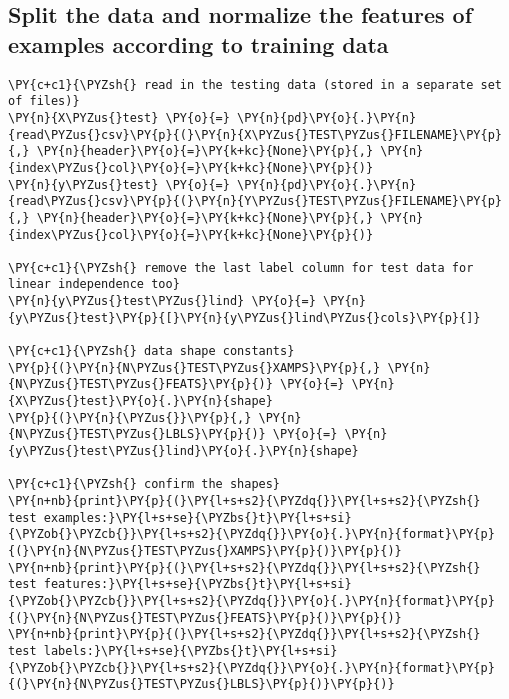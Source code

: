     \hypertarget{split-the-data-and-normalize-the-features-of-examples-according-to-training-data}{%
\subsection{Split the data and normalize the features of examples
according to training
data}\label{split-the-data-and-normalize-the-features-of-examples-according-to-training-data}}

    \begin{tcolorbox}[breakable, size=fbox, boxrule=1pt, pad at break*=1mm,colback=cellbackground, colframe=cellborder]
\begin{Verbatim}[commandchars=\\\{\}]
\PY{c+c1}{\PYZsh{} read in the testing data (stored in a separate set of files)}
\PY{n}{X\PYZus{}test} \PY{o}{=} \PY{n}{pd}\PY{o}{.}\PY{n}{read\PYZus{}csv}\PY{p}{(}\PY{n}{X\PYZus{}TEST\PYZus{}FILENAME}\PY{p}{,} \PY{n}{header}\PY{o}{=}\PY{k+kc}{None}\PY{p}{,} \PY{n}{index\PYZus{}col}\PY{o}{=}\PY{k+kc}{None}\PY{p}{)}
\PY{n}{y\PYZus{}test} \PY{o}{=} \PY{n}{pd}\PY{o}{.}\PY{n}{read\PYZus{}csv}\PY{p}{(}\PY{n}{Y\PYZus{}TEST\PYZus{}FILENAME}\PY{p}{,} \PY{n}{header}\PY{o}{=}\PY{k+kc}{None}\PY{p}{,} \PY{n}{index\PYZus{}col}\PY{o}{=}\PY{k+kc}{None}\PY{p}{)}

\PY{c+c1}{\PYZsh{} remove the last label column for test data for linear independence too}
\PY{n}{y\PYZus{}test\PYZus{}lind} \PY{o}{=} \PY{n}{y\PYZus{}test}\PY{p}{[}\PY{n}{y\PYZus{}lind\PYZus{}cols}\PY{p}{]}

\PY{c+c1}{\PYZsh{} data shape constants}
\PY{p}{(}\PY{n}{N\PYZus{}TEST\PYZus{}XAMPS}\PY{p}{,} \PY{n}{N\PYZus{}TEST\PYZus{}FEATS}\PY{p}{)} \PY{o}{=} \PY{n}{X\PYZus{}test}\PY{o}{.}\PY{n}{shape}
\PY{p}{(}\PY{n}{\PYZus{}}\PY{p}{,} \PY{n}{N\PYZus{}TEST\PYZus{}LBLS}\PY{p}{)} \PY{o}{=} \PY{n}{y\PYZus{}test\PYZus{}lind}\PY{o}{.}\PY{n}{shape}

\PY{c+c1}{\PYZsh{} confirm the shapes}
\PY{n+nb}{print}\PY{p}{(}\PY{l+s+s2}{\PYZdq{}}\PY{l+s+s2}{\PYZsh{} test examples:}\PY{l+s+se}{\PYZbs{}t}\PY{l+s+si}{\PYZob{}\PYZcb{}}\PY{l+s+s2}{\PYZdq{}}\PY{o}{.}\PY{n}{format}\PY{p}{(}\PY{n}{N\PYZus{}TEST\PYZus{}XAMPS}\PY{p}{)}\PY{p}{)}
\PY{n+nb}{print}\PY{p}{(}\PY{l+s+s2}{\PYZdq{}}\PY{l+s+s2}{\PYZsh{} test features:}\PY{l+s+se}{\PYZbs{}t}\PY{l+s+si}{\PYZob{}\PYZcb{}}\PY{l+s+s2}{\PYZdq{}}\PY{o}{.}\PY{n}{format}\PY{p}{(}\PY{n}{N\PYZus{}TEST\PYZus{}FEATS}\PY{p}{)}\PY{p}{)}
\PY{n+nb}{print}\PY{p}{(}\PY{l+s+s2}{\PYZdq{}}\PY{l+s+s2}{\PYZsh{} test labels:}\PY{l+s+se}{\PYZbs{}t}\PY{l+s+si}{\PYZob{}\PYZcb{}}\PY{l+s+s2}{\PYZdq{}}\PY{o}{.}\PY{n}{format}\PY{p}{(}\PY{n}{N\PYZus{}TEST\PYZus{}LBLS}\PY{p}{)}\PY{p}{)}
\end{Verbatim}
\end{tcolorbox}

